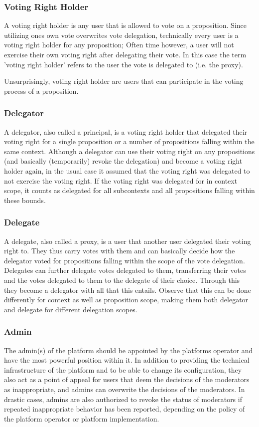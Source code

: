 \subsubsection{Voting Right Holder}
\label{ssec:Roles_VotingRightHolder}
A voting right holder is any user that is allowed to vote on a proposition.
Since utilizing ones own vote overwrites vote delegation, technically every user is a voting right holder for any proposition; Often time however, a user will not exercise their own voting right after delegating their vote.
In this case the term 'voting right holder' refers to the user the vote is delegated to (i.e. the proxy). 

Unsurprisingly, voting right holder are users that can participate in the voting process of a proposition.

\subsubsection{Delegator}
\label{ssec:Roles_Delegator}
A delegator, also called a principal, is a voting right holder that delegated their voting right for a single proposition or a number of propositions falling within the same context.
Although a delegator can use their voting right on any propositions (and basically (temporarily) revoke the delegation) and become a voting right holder again, in the usual case it assumed that the voting right was delegated to not exercise the voting right.
If the voting right was delegated for in context scope, it counts as delegated for all subcontexts and all propositions falling within these bounds. 

\subsubsection{Delegate}
\label{ssec:Roles_Delegate}
A delegate, also called a proxy, is a user that another user delegated their voting right to.
They thus carry votes with them and can basically decide how the delegator voted for propositions falling within the scope of the vote delegation.
Delegates can further delegate votes delegated to them, transferring their votes and the votes delegated to them to the delegate of their choice. 
Through this they become a delegator with all that this entails.
Observe that this can be done differently for context as well as proposition scope, making them both delegator and delegate for different delegation scopes.

\subsubsection{Admin}
\label{ssec:Roles_Admin}
The admin(s) of the platform should be appointed by the platforms operator and have the most powerful position within it.
In addition to providing the technical infrastructure of the platform and to be able to change its configuration, they also act as a point of appeal for users that deem the decisions of the moderators as inappropriate, and admins can overwrite the decisions of the moderators.
In drastic cases, admins are also authorized to revoke the status of moderators if repeated inappropriate behavior has been reported, depending on the policy of the platform operator or platform implementation.

